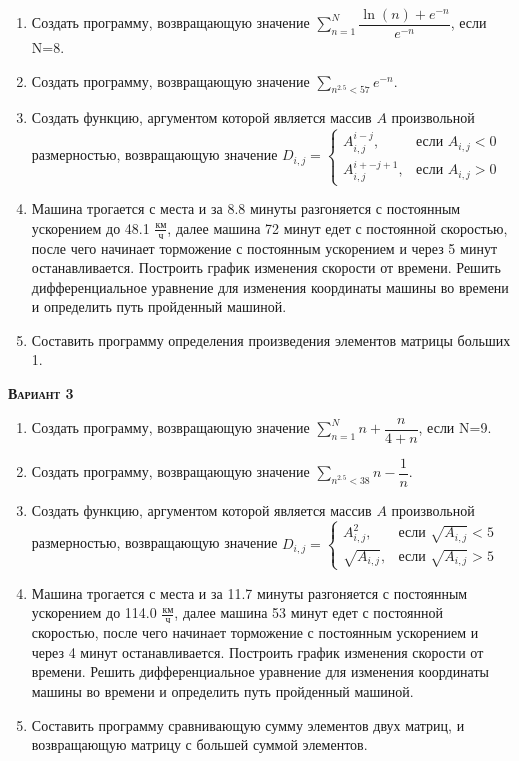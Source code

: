 \begin{enumerate}
\item  Создать программу, возвращающую значение $\sum\limits_{n=1}^{N} \dfrac{\ln(n)+e^{-n}}{e^{-n}} $, если N=8. 
\item  Создать программу, возвращающую значение $\sum\limits_{n^{2.5}<  57} {e^{-n}}                      $. 
\item Создать функцию, аргументом которой является массив $A$ произвольной размерностью, возвращающую значение $D_{i,j}=\begin{cases} A_{i,j}^{i-j}, & \text{если } {A_{i,j}}<0 \\  A_{i,j}^{i+-j+1}, & \text{если } {A_{i,j}}>0 \end{cases}                 $ 
\item Машина трогается с места и за  8.8 минуты разгоняется с постоянным ускорением до 48.1 ${\frac{км}{ч}}$, далее машина   72 минут едет с постоянной скоростью, после чего начинает торможение с постоянным ускорением и через   5 минут останавливается. Построить график изменения скорости от времени. Решить дифференциальное уравнение для изменения координаты машины во времени и определить путь пройденный машиной.  \item Составить программу определения произведения элементов матрицы больших 1.                                                                                                                                                                            

\end{enumerate}
\textsc{\textbf{Вариант 3}}
\begin{enumerate}
\item  Создать программу, возвращающую значение $\sum\limits_{n=1}^{N} n+\dfrac{n}{4+n}              $, если N=9. 
\item  Создать программу, возвращающую значение $\sum\limits_{n^{2.5}<  38} {n -\dfrac{1}{n}}             $. 
\item Создать функцию, аргументом которой является массив $A$ произвольной размерностью, возвращающую значение $D_{i,j}=\begin{cases} A_{i,j}^2, & \text{если } \sqrt{A_{i,j}}<5 \\ \sqrt{A_{i,j}}, & \text{если } \sqrt{A_{i,j}}>5 \end{cases}              $ 
\item Машина трогается с места и за 11.7 минуты разгоняется с постоянным ускорением до 114.0 ${\frac{км}{ч}}$, далее машина   53 минут едет с постоянной скоростью, после чего начинает торможение с постоянным ускорением и через   4 минут останавливается. Построить график изменения скорости от времени. Решить дифференциальное уравнение для изменения координаты машины во времени и определить путь пройденный машиной.  \item Составить программу сравнивающую сумму элементов двух матриц, и возвращающую матрицу с большей суммой элементов.                                                                                                    

\end{enumerate}
